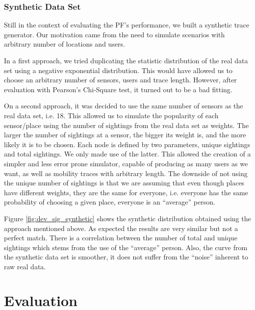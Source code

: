 \subsubsection{Synthetic Data Set}
\label{sec:simulator}

Still in the context of evaluating the PF's performance, we built a
synthetic trace generator. Our motivation came from the need to
simulate scenarios with arbitrary number of locations and users.

In a first approach, we tried duplicating
the statistic distribution of the real data set using a negative
exponential distribution. This would have allowed us to choose an
arbitrary number of sensors, users and trace length. However, after
evaluation with Pearson's Chi-Square test, it turned out to be a bad
fitting. 

On a second approach,  it was decided to use the
same number of sensors as the real data set, i.e. 18. This allowed us
to simulate the popularity of each sensor/place using the number of
sightings from the real data set as weights. The larger the number of
sightings at a sensor, the bigger its weight is, and the more likely
it is to be chosen. Each node is defined by two parameters, unique
sightings and total sightings. We only made use of the latter. This
allowed the creation of a simpler and less error prone simulator,
capable of producing as many users as we want, as well as mobility
traces with arbitrary length. The downside of not using the unique
number of sightings is that we are assuming that even though places
have different weights, they are the same for everyone, i.e. everyone
has the same probability of choosing a given place, everyone is an
``average'' person.

Figure \ref{fig:dev_sig_synthetic} shows the synthetic distribution
obtained using the approach mentioned above.  As expected the results
are very similar but not a perfect match. There is a
correlation between the number of total and unique sightings which
stems from the use of the ``average'' person. Also, the curve from the
synthetic data set is smoother, it does not suffer from the
``noise'' inherent to raw real data.

\section{Evaluation}
\label{sec:ct-evaluation}

